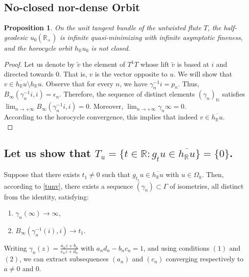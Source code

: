 \documentclass[11pt]{amsart}
\newtheorem{prp}{Proposition}
\begin{document}
\subsection{No-closed nor-dense Orbit}
\begin{prp}
On the unit tangent bundle of the untwisted flute $T$, the half-geodesic $u_0(\mathbb{R}_+)$ is infinite quasi-minimizing with infinite asymptotic fineness, and the horocycle orbit $h_\mathbb{R} u_0 $ is not closed.\\
\end{prp}
\begin{proof}
Let us denote by $\tilde{v}$ the element of $T^1 T$ whose lift $\tilde{v}$ is based at $i$ and directed towards $0$. That is, $v$ is the vector opposite to $u$.
We will show that $v \in \overline{h_\mathbb{R} u} \setminus h_\mathbb{R} u$. Observe that for every $n$, we have $\gamma_n^{-1} i = p_n$. Thus, $B_\infty(\gamma_n^{-1} i, i) =\epsilon_n.$
Therefore, the sequence of distinct elements $(\gamma_n)_{\mathbb{N}}$ satisfies $\lim_{n \to +\infty} B_\infty(\gamma_n^{-1} i, i) = 0.$ Moreover, $\lim_{n \to +\infty} \gamma_n \infty = 0.$
\\
According to the horocycle convergence, this implies that indeed $v \in \overline{h_\mathbb{R} u}$.\\
\end{proof}

\subsection{Let us show that $T_u = \{ t \in \mathbb{R} : g_t u \in \overline{h_{\mathbb{R}} u} \} = \{0\}$.}

Suppose that there exists $t_1\neq 0$ such that $g_{t_{1}}u \in\overline{h_{\mathbb{R}}u}$ with $u\in\Omega_{h}$.
Then, according to \ref{tunv}, there exists a sequence $(\gamma_n)\subset\Gamma$ of isometries, all distinct from the identity, satisfying:


\begin{enumerate}
    \item $\gamma_n(\infty) \to \infty $,
    \item $B_\infty(\gamma_{n}^{-1}(i), i) \to t_1 $.
\end{enumerate}

Writing $\gamma_n(z) = \frac{a_n z + b_n}{c_n z + d_n}$  with $ a_n d_n - b_n c_n = 1 $, and using conditions $(1)$ and $(2)$, we can extract subsequences $(a_n)$ and $(c_n)$ converging respectively to $a \neq 0 $ and $0$.
\end{document}
